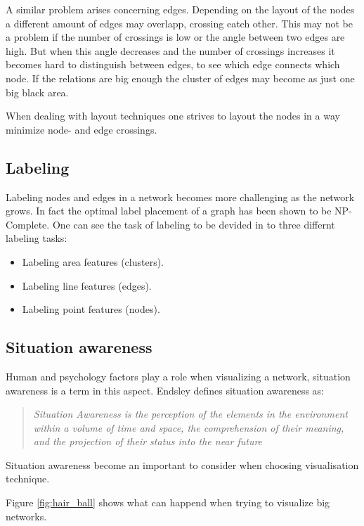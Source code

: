 \documentclass[a4paper,11pt]{kth-mag}
\begin{document}
A similar problem arises concerning edges. Depending on the layout of the nodes a different amount of edges may overlapp, crossing eatch other. This may not be a problem if the number of crossings is low or the angle between 
two edges are high. But when this angle decreases and the number of crossings increases it becomes hard to distinguish between edges, to see which edge connects which node. If the relations are big enough the cluster of edges
may become as just one big black area.

When dealing with layout techniques one strives to layout the nodes in a way minimize node- and edge crossings.
\subsection{Labeling}
Labeling nodes and edges in a network becomes more challenging as the network grows. In fact the optimal label placement of a graph has been shown to be NP-Complete\cite{Marks91thecomputational}.
One can see the task of labeling to be devided in to three differnt labeling tasks:
\begin{itemize}
	\item{Labeling area features (clusters).}
	\item{Labeling line features (edges).}
	\item{Labeling point features (nodes).}
\end{itemize}
\subsection{Situation awareness}
Human and psychology factors play a role when visualizing a network, situation awareness is a term in this aspect. Endsley\cite{195097} defines situation awareness as:
\begin{quote}
\emph{Situation Awareness is the perception of the elements in the environment within a volume of time and space, the comprehension of their meaning, and
the projection of their status into the near future}
\end{quote}
Situation awareness become an important to consider when choosing visualisation technique.

Figure \ref{fig:hair_ball} shows  what can happend when trying to visualize big networks.
\end{document}
